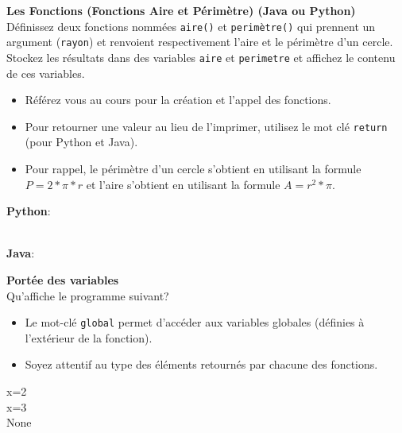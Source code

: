   \begin{Exercice}[5 minutes] \textbf{Les Fonctions (Fonctions Aire et Périmètre) (Java ou Python)}\\
      Définissez deux fonctions nommées \lstinline{aire()} et \lstinline{perimètre()} qui prennent un argument (\lstinline{rayon}) et renvoient respectivement l'aire et le périmètre d'un cercle. Stockez les résultats dans des variables \lstinline{aire} et \lstinline{perimetre} et affichez le contenu de ces variables.   \\
     
      \begin{conseil}
          \begin{itemize}
              \item Référez vous au cours pour la création et l'appel des fonctions.
              \item Pour retourner une valeur au lieu de l'imprimer, utilisez le mot clé \lstinline{return} (pour Python et Java).
              \item Pour rappel, le périmètre d'un cercle s'obtient en utilisant la formule $P = 2*\pi*r$ et l'aire s'obtient en utilisant la formule $A = r^2*\pi$.
          \end{itemize}        
      \end{conseil}
      \begin{solution}
          \textbf{Python}:
          
          
          \textbf{\\Java}:
          
      \end{solution}   
  \end{Exercice} 

  \begin{Exercice}[5 minutes] \textbf{Portée des variables}\\
    Qu'affiche le programme suivant? \\

    

    
     \begin{conseil}
        \begin{itemize}
            \item Le mot-clé \lstinline{global} permet d'accéder aux variables globales (définies à l'extérieur de la fonction).
            \item Soyez attentif au type des éléments retournés par chacune des fonctions.
        \end{itemize}
     \end{conseil}
     \begin{solution}
            x=2 \\
            x=3 \\
            None   
    \end{solution}
 \end{Exercice}

